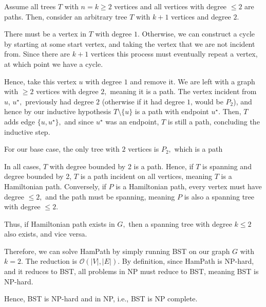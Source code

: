 \documentclass[12pt]{article}
\begin{document}
\begin{enumerate}
\begin{itemize}
        Assume all trees $T$ with $n = k \geq 2$ vertices and all
        vertices with degree $\leq 2$  are paths. Then, consider an
        arbitrary tree $T$ with $k + 1$ vertices and degree $2.$

        There must be a vertex in $T$ with degree $1.$ Otherwise, we
        can construct a cycle by starting at some start vertex, and
        taking the vertex that we are not incident from. Since there
        are $k + 1$ vertices this process must eventually repeat a
        vertex, at which point we have a cycle.

        Hence, take this vertex $u$ with degree $1$ and remove it. We
        are left with a graph with $\geq 2$ vertices with degree $2,$
        meaning it is a path. The vertex incident from $u$,
        $u^\star,$ previously had degree $2$ (otherwise if it had
        degree $1$, would be $P_2$), and hence by our inductive
        hypothesis $T \setminus \{u\}$ is a path with endpoint
        $u^\star.$ Then, $T$ adds edge $\{u, u^\star\},$ and since
        $u^\star$ was an endpoint, $T$ is still a path, concluding
        the inductive step.

        For our base case, the only tree with $2$ vertices is $P_2,$
        which is a path
    \end{itemize}

    In all cases, $T$ with degree bounded by 2 is a path. Hence, if
    $T$ is spanning and degree bounded by 2, $T$ is a path incident
    on all vertices, meaning $T$ is a Hamiltonian path. Conversely,
    if $P$ is a Hamiltonian path, every vertex must have degree $\leq
    2,$ and the path must be spanning, meaning $P$ is also a spanning
    tree with degree $\leq 2.$

    Thus, if Hamiltonian path exists in $G,$ then a spanning tree
    with degree $k\leq 2$ also exists, and vice versa.

    Therefore, we can solve HamPath by simply running BST on our
    graph $G$ with $k = 2.$ The reduction is $\mathcal O(|V|, |E|).$
    By definition, since HamPath is NP-hard, and it reduces to BST,
    all problems in NP must reduce to BST, meaning BST is NP-hard.

    Hence, BST is NP-hard and in NP, i.e., BST is NP complete.
\end{enumerate}
\end{document}
